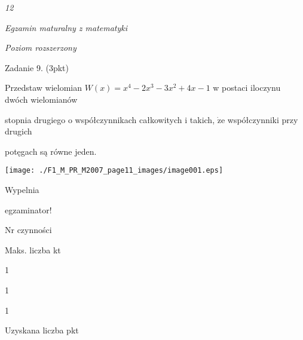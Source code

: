 \documentclass[a4paper,12pt]{article}
\begin{document}
{\it 12}

{\it Egzamin maturalny z matematyki}

{\it Poziom rozszerzony}

Zadanie 9. (3pkt)

Przedstaw wielomian $W(x)=x^{4}-2x^{3}-3x^{2}+4x-1$ w postaci iloczynu dwóch wielomianów

stopnia drugiego o współczynnikach całkowitych i takich, $\dot{\mathrm{z}}\mathrm{e}$ współczynniki przy drugich

potęgach są równe jeden.
\begin{center}
\texttt{[image: ./F1\_M\_PR\_M2007\_page11\_images/image001.eps]}
\end{center}
Wypelnia

egzaminator!

Nr czynności

Maks. liczba kt

1

1

1

Uzyskana liczba pkt
\end{document}
